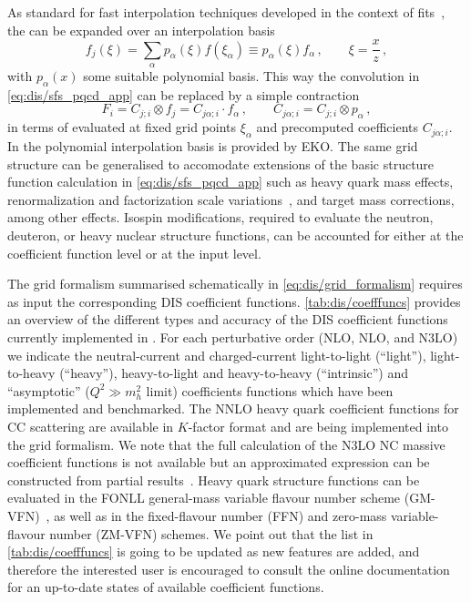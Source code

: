 As standard for fast interpolation techniques developed in the context of \pdf{}
fits~\cite{Carli:2010rw,Carrazza:2020gss,Wobisch:2011ij,Bertone:2014zva}, the
\pdfs can be expanded over an interpolation basis \begin{equation}
f_j(\xi) = \sum_\alpha p_\alpha(\xi) f(\xi_\alpha) \equiv p_\alpha(\xi) f_\alpha \, ,
\qquad \xi = \frac x z \, ,
\end{equation}
with $p_\alpha(x)$ some suitable polynomial basis.
%
This way the convolution in \cref{eq:dis/sfs_pqcd_app} can be replaced by a
simple contraction
\begin{equation}
\label{app/dis:grid_formalism}
F_i = C_{j; i} \otimes f_j = C_{j \alpha; i} \cdot f_\alpha \, ,\qquad
C_{j \alpha; i} = C_{j; i} \otimes p_\alpha \, ,
\end{equation}
in terms of \pdfs evaluated at fixed grid points $\xi_\alpha$ and precomputed
coefficients $C_{j \alpha; i}$.
%
In \yadism the polynomial interpolation basis is  provided by \textsc{\small
EKO}.
%
The same grid structure can be generalised to accomodate extensions of the
basic structure function calculation in \cref{eq:dis/sfs_pqcd_app} such as
heavy quark mass effects, renormalization and factorization scale
variations~\cite{NNPDF:2019vjt,NNPDF:2019ubu}, and target mass corrections,
among other effects.
%
Isospin modifications, required to evaluate the neutron, deuteron, or heavy
nuclear structure functions, can be accounted for either at the coefficient
function level or at the input \pdf{} level.

The grid formalism summarised schematically in \cref{eq:dis/grid_formalism}
requires as input the corresponding DIS coefficient functions.
%
\cref{tab:dis/coefffuncs} provides an overview of the different types and
accuracy of the DIS coefficient functions currently implemented in \yadism.
%
For each perturbative order (NLO, NLO, and N3LO) we indicate  the
neutral-current and charged-current light-to-light (``light''), light-to-heavy
(``heavy''), heavy-to-light and heavy-to-heavy (``intrinsic'') and
``asymptotic'' ($Q^2 \gg m_h^2$ limit)  coefficients functions which have been
implemented and benchmarked.
%
The NNLO heavy quark coefficient functions for CC scattering are available in
$K$-factor format and are being implemented into the \yadism grid formalism.
%
We note that the full calculation of the N3LO NC massive coefficient functions
is not available but an approximated expression can be constructed from partial
results~\cite{niccolo}.
%
Heavy quark structure functions can be evaluated in the FONLL general-mass
variable flavour number scheme (GM-VFN)~\cite{Forte:2010ta}, as well as in the
fixed-flavour number (FFN) and zero-mass variable-flavour number (ZM-VFN)
schemes.
%
We point out that the list in \cref{tab:dis/coefffuncs} is going to be updated
as new features are added, and therefore the interested user is encouraged to
consult the online documentation for an up-to-date states of available
coefficient functions.

